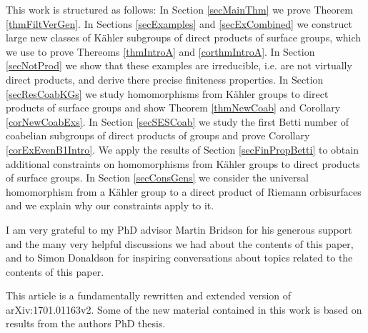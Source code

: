 This work is structured as follows: In Section \ref{secMainThm} we prove Theorem \ref{thmFiltVerGen}. In Sections \ref{secExamples} and \ref{secExCombined} we construct large new classes of K\"ahler subgroups of direct products of surface groups, which we use to prove Thereoms \ref{thmIntroA} and \ref{corthmIntroA}. In Section \ref{secNotProd} we show that these examples are irreducible, i.e. are not virtually direct products, and derive there precise finiteness properties. In Section \ref{secResCoabKGs} we study homomorphisms from K\"ahler groups to direct products of surface groups and show Theorem \ref{thmNewCoab} and Corollary \ref{corNewCoabExs}. In Section \ref{secSESCoab} we study the first Betti number of coabelian subgroups of direct products of groups and prove Corollary \ref{corExEvenB1Intro}. We apply the results of Section \ref{secFinPropBetti} to obtain additional constraints on homomorphisms from K\"ahler groups to direct products of surface groups. In Section \ref{secConsGens} we consider the universal homomorphism from a K\"ahler group to a direct product of Riemann orbisurfaces and we explain why our constraints apply to it.

 
\begin{acknowledgements*}
I am very grateful to my PhD advisor Martin Bridson for his generous support and the many very helpful discussions we had about the contents of this paper, and to Simon Donaldson for inspiring conversations about topics related to the contents of this paper.

This article is a fundamentally rewritten and extended version of arXiv:1701.01163v2. Some of the new material contained in this work is based on results from the authors PhD thesis. 
\end{acknowledgements*}